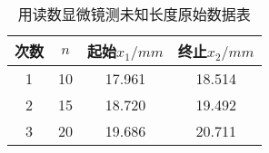 \documentclass[a4 paper,12pt]{article}
\begin{document}
\begin{table}[H] 
	\caption{用读数显微镜测未知长度原始数据表}
	\label{用读数显微镜测未知长度原始数据表}
	\centering
		\begin{tabular}{cccc}
			\toprule[0.5mm]
			次数 & $n$ & 起始$x_{1}/mm $ & 终止$x_{2}/mm$  \\
			\midrule
			1 & 10  & 17.961  & 18.514 \\
			2 & 15 & 18.720  & 19.492  \\
			3 & 20  & 19.686  & 20.711  \\
			\bottomrule[0.5mm]
	\end{tabular}
\end{table}
\end{document}
